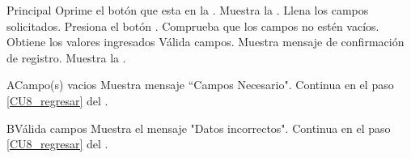     \begin{UCtrayectoria}{Principal}
    \UCpaso[\UCactor] Oprime el botón  que esta en la .
    \UCpaso Muestra la .
    \UCpaso[\UCactor] Llena los campos solicitados. \label{CU8_regresar}
    \UCpaso[\UCactor] Presiona el botón .
    \UCpaso Comprueba que los campos no estén vacíos. 
    \UCpaso Obtiene los valores ingresados
    \UCpaso Válida campos. 
    \UCpaso Muestra mensaje de confirmación de registro.
    \UCpaso Muestra la .
    \end{UCtrayectoria}
    
    \begin{UCtrayectoriaA}{A}{Campo(s) vacios}
    	\UCpaso Muestra mensaje “Campos Necesario".
    	\UCpaso Continua en el paso \ref{CU8_regresar} del .
    \end{UCtrayectoriaA}

	\begin{UCtrayectoriaA}{B}{Válida campos}
		\UCpaso Muestra el mensaje "Datos incorrectos".
   		\UCpaso Continua en el paso \ref{CU8_regresar} del .
	\end{UCtrayectoriaA}

	


